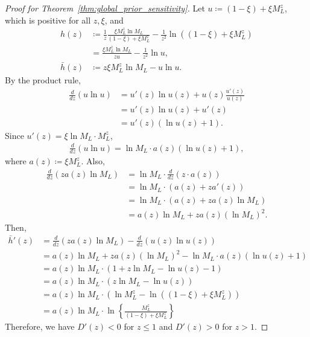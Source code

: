 \documentclass[12pt]{article}
\begin{document}
\begin{proof}[Proof for Theorem~\ref{thm:global_prior_sensitivity}]
    Let $u \coloneqq (1 - \xi) + \xi M_L^z$, which is positive for all $z, \xi$, and
    \begin{align*}
        h(z) &\coloneqq \frac{1}{z}\frac{\xi M_L^z \ln M_L}{(1 - \xi) + \xi M_L^z} - \frac{1}{z^2}\ln\left((1 - \xi) + \xi M_L^z \right) \\
        &= \frac{\xi M_L^z \ln M_L}{zu} - \frac{1}{z^2}\ln u, \\
        \bar{h}(z) &\coloneqq z \xi M_L^z \ln M_L - u \ln u.
    \end{align*}
    By the product rule,
    \begin{align*}
        \frac{d}{dz}\left(u \ln u \right) &= u'(z) \ln u(z) + u(z)\frac{u'(z)}{u(z)} \\
        &= u'(z) \ln u(z) + u'(z) \\
        &= u'(z) \left(\ln u(z) + 1 \right).
    \end{align*}
    Since $u'(z) = \xi \ln M_L \cdot M_L^z$,
    \begin{align*}
        \frac{d}{dz}\left(u \ln u\right) = \ln M_L \cdot a(z)\left(\ln u(z) + 1\right),
    \end{align*}
    where $a(z) \coloneqq \xi M_L^z$.
    Also,
    \begin{align*}
        \frac{d}{dz}\left(z a(z) \ln M_L \right) &= \ln M_L \cdot \frac{d}{dz}\left(z \cdot a(z)\right) \\
        &= \ln M_L \cdot \left(a(z) + z a'(z)\right) \\
        &= \ln M_L \cdot \left(a(z) + z a(z) \ln M_L \right) \\
        &= a(z) \ln M_L + z a(z) (\ln M_L)^2.
    \end{align*}
    Then,
    \begin{align*}
        \bar{h}'(z) &= \frac{d}{dz}\left(z a(z) \ln M_L \right) - \frac{d}{dz}\left(u(z) \ln u(z) \right) \\
        &= a(z) \ln M_L + z a(z) (\ln M_L)^2 - \ln M_L \cdot a(z) \left(\ln u(z) + 1\right) \\
        &= a(z) \ln M_L \cdot \left(1 + z \ln M_L - \ln u(z) - 1\right) \\
        &= a(z) \ln M_L \cdot \left(z \ln M_L - \ln u(z) \right) \\
        &= a(z) \ln M_L \cdot \left(\ln M_L^z - \ln\left((1 - \xi) + \xi M_L^z \right) \right) \\
        &= a(z) \ln M_L \cdot \ln \left\{\frac{M_L^z}{(1 - \xi) + \xi M_L^z} \right\}
    \end{align*}
    Therefore, we have $D'(z) < 0$ for $z \leq 1$ and $D'(z) > 0$ for $z > 1$.


\end{proof}
\end{document}
